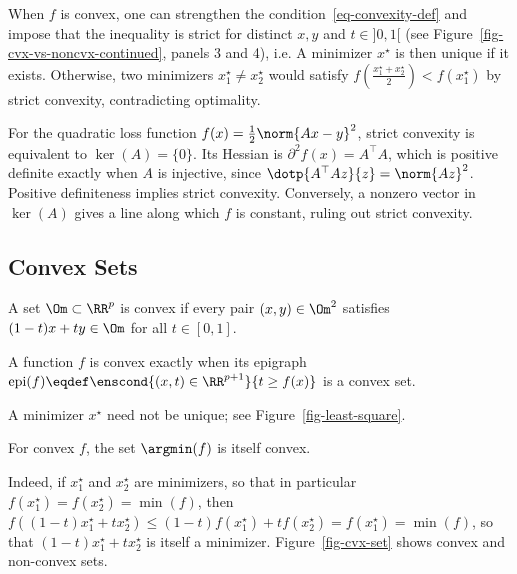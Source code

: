 When $f$ is convex, one can strengthen the condition~\eqref{eq-convexity-def} and impose that the inequality is strict for distinct $x,y$ and $t\in]0,1[$ (see Figure~\ref{fig-cvx-vs-noncvx-continued}, panels 3 and 4), i.e.
\eql{\label{eq-strict-convexity-def}
	\foralls t \in ]0,1[, \quad
		f((1-t)x + t y) < (1-t)f(x) + t f(y).
}
A minimizer $x^\star$ is then unique if it exists. Otherwise, two minimizers $x_1^\star \neq x_2^\star$ would satisfy $f(\frac{x_1^\star+x_2^\star}{2}) < f(x_1^\star)$ by strict convexity, contradicting optimality.

\begin{exmp}
	For the quadratic loss function $f(x)=\frac{1}{2}\norm{Ax-y}^2$, strict convexity is equivalent to $\ker(A)=\{0\}$.
	Its Hessian is $\partial^2 f(x)=A^\top A$, which is positive definite exactly when $A$ is injective, since $\dotp{A^\top A z}{z}=\norm{Az}^2$. Positive definiteness implies strict convexity. Conversely, a nonzero vector in $\ker(A)$ gives a line along which $f$ is constant, ruling out strict convexity.
\end{exmp}

                                                                                  
\subsection{Convex Sets}

A set $\Om \subset \RR^p$ is convex if every pair $(x,y) \in \Om^2$ satisfies $(1-t)x + t y \in \Om$ for all $t \in [0,1]$.
 
A function $f$ is convex exactly when its epigraph $\text{epi}(f) \eqdef \enscond{(x,t) \in \RR^{p+1}}{t \geq f(x)}$ is a convex set.

\begin{rem}
A minimizer $x^\star$ need not be unique; see Figure~\ref{fig-least-square}.
 
For convex $f$, the set $\argmin(f)$ is itself convex.
 
Indeed, if $x_1^\star$ and $x_2^\star$ are minimizers, so that in particular $f(x_1^\star)=f(x_2^\star)=\min(f)$, then $f( (1-t)x_1^\star + t x_2^\star ) \leq (1-t) f(x_1^\star) + t f(x_2^\star) = f(x_1^\star) = \min(f)$, so that $(1-t)x_1^\star + t x_2^\star$ is itself a minimizer. Figure~\ref{fig-cvx-set} shows convex and non-convex sets. 
\end{rem}



                                               